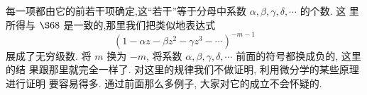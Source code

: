 每一项都由它的前若干项确定,这“若干”等于分母中系数 $\alpha, \beta, \gamma, \delta, \cdots$ 的个数. 这 里所得与 $\S 68$ 是一致的,那里我们把类似地表达式
\[
\left(1-\alpha z-\beta z^{2}-\gamma z^{3}-\cdots\right)^{-m-1}
\]
展成了无穷级数. 将 $m$ 换为 $-m$, 将系数 $\alpha, \beta, \gamma, \delta, \cdots$ 前面的符号都换成负的, 这里的结 果跟那里就完全一样了. 对这里的规律我们不做证明, 利用微分学的某些原理进行证明 要容易得多. 通过前面那么多例子, 大家对它的成立不会怀疑的. 

